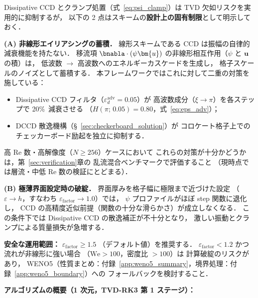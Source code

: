 \begin{tcolorbox}[warnbox, title={線形 CCD 移流の残余リスクと既知の失敗モード}]
\label{warn:adv_risks}

Dissipative CCD とクランプ処置（式~\eqref{eq:psi_clamp}）は
TVD 欠如リスクを実用的に抑制するが，
以下の 2 点はスキームの\textbf{設計上の固有制限}として明示しておく．

\medskip
\noindent\textbf{(A) 非線形エイリアシングの蓄積．}
線形スキームである CCD は振幅の自律的減衰機能を持たない．
移流項 $\bnabla\cdot(\psi\bm{u})$ の非線形相互作用（$\psi$ と $\bm{u}$ の積）は，
低波数 $\to$ 高波数へのエネルギーカスケードを生成し，
格子スケールのノイズとして蓄積する．
本フレームワークではこれに対して二重の対策を施している：
\begin{itemize}
  \item Dissipative CCD フィルタ（$\varepsilon_d^{\mathrm{adv}} = 0.05$）が
        高波数成分（$\xi \to \pi$）を各ステップで 20\%\ 減衰させる
        （$H(\pi;\,0.05) = 0.80$，式~\eqref{eq:eps_adv}）；
  \item DCCD 散逸機構（§~\ref{sec:checkerboard_solution}）が
        コロケート格子上でのチェッカーボード励起を独立に抑制する．
\end{itemize}
高 $\mathrm{Re}$ 数・高解像度（$N \geq 256$）ケースにおいて
これらの対策が十分かどうかは，第~\ref{sec:verification}章の
乱流混合ベンチマークで評価すること
（現時点では層流・中低 $\mathrm{Re}$ 数の検証にとどまる）．

\medskip
\noindent\textbf{(B) 極薄界面設定時の破綻．}
界面厚みを格子幅に極限まで近づけた設定
（$\varepsilon \to h$，すなわち $\varepsilon_{\mathrm{factor}} \to 1.0$）では，
$\psi$ プロファイルがほぼ step 関数に退化し，
CCD の高精度近似前提（関数の十分な滑らかさ）が成立しなくなる．
この条件下では Dissipative CCD の散逸補正が不十分となり，
激しい振動とクランプによる質量損失が急増する．

\textbf{安全な運用範囲：} $\varepsilon_{\mathrm{factor}} \geq 1.5$
（デフォルト値）を推奨する．
$\varepsilon_{\mathrm{factor}} < 1.2$ かつ流れが非線形に強い場合
（$\mathrm{We} > 100$，密度比 $> 100$）は
計算破綻のリスクがあり，
WENO5（性質まとめ：付録~\ref{app:weno5_summary}，境界処理：付録~\ref{app:weno5_boundary}）への
フォールバックを検討すること．
\end{tcolorbox}

\medskip
\noindent\textbf{アルゴリズムの概要（1 次元，TVD-RK3 第 1 ステージ）：}

